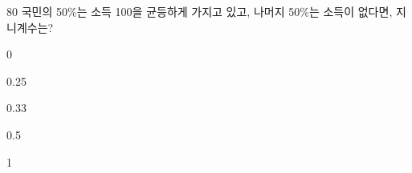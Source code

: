 \begin{question}{80}
국민의 50\%는 소득 100을 균등하게 가지고 있고, 나머지 50\%는 소득이 없다면, 지니계수는?
\begin{choices}
  \item 0
  \item 0.25
  \item 0.33
  \item 0.5
  \item 1
\end{choices}
\end{question}
